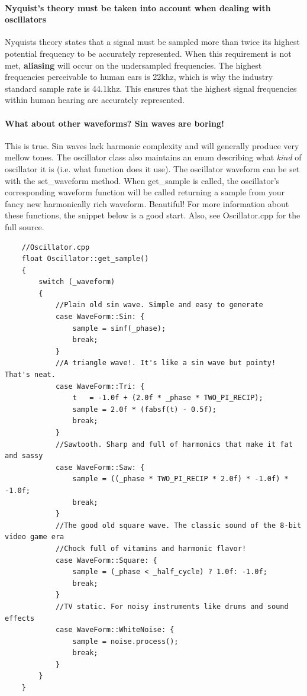 \documentclass[acmlarge,screen]{acmart}
\begin{document}
	\paragraph{\textbf{Nyquist's theory} must be taken into account when dealing with oscillators} Nyquists theory states that a signal must be sampled more than twice its highest potential frequency to be accurately represented. When this requirement is not met, \textbf{aliasing} will occur on the undersampled frequencies. The highest frequencies perceivable to human ears is 22khz, which is why the industry standard sample rate is 44.1khz. This ensures that the highest signal frequencies within human hearing are accurately represented.

	\paragraph{What about other waveforms? Sin waves are boring!} This is true. Sin waves lack harmonic complexity and will generally produce very mellow tones. The oscillator class also maintains an enum describing what \textit{kind} of oscillator it is (i.e. what function does it use). The oscillator waveform can be set with the set\_waveform method. When get\_sample is called, the oscillator's corresponding waveform function will be called returning a sample from your fancy new harmonically rich waveform. \cite{downey_2016} Beautiful! For more information about these functions, the snippet below is a good start. Also, see Oscillator.cpp for the full source.
	

	\begin{verbatim}
	//Oscillator.cpp
	float Oscillator::get_sample()
	{
		switch (_waveform)
		{
			//Plain old sin wave. Simple and easy to generate
			case WaveForm::Sin: {
				sample = sinf(_phase);
				break;
			}
			//A triangle wave!. It's like a sin wave but pointy! That's neat.
			case WaveForm::Tri: {
				t   = -1.0f + (2.0f * _phase * TWO_PI_RECIP);
				sample = 2.0f * (fabsf(t) - 0.5f);
				break;
			}
			//Sawtooth. Sharp and full of harmonics that make it fat and sassy
			case WaveForm::Saw: {
				sample = ((_phase * TWO_PI_RECIP * 2.0f) * -1.0f) * -1.0f;
				break;
			}
			//The good old square wave. The classic sound of the 8-bit video game era
			//Chock full of vitamins and harmonic flavor!
			case WaveForm::Square: {
				sample = (_phase < _half_cycle) ? 1.0f: -1.0f;
				break;
			}
			//TV static. For noisy instruments like drums and sound effects
			case WaveForm::WhiteNoise: {
				sample = noise.process();
				break;
			}
		}
	}
	\end{verbatim}
	
\end{document}
